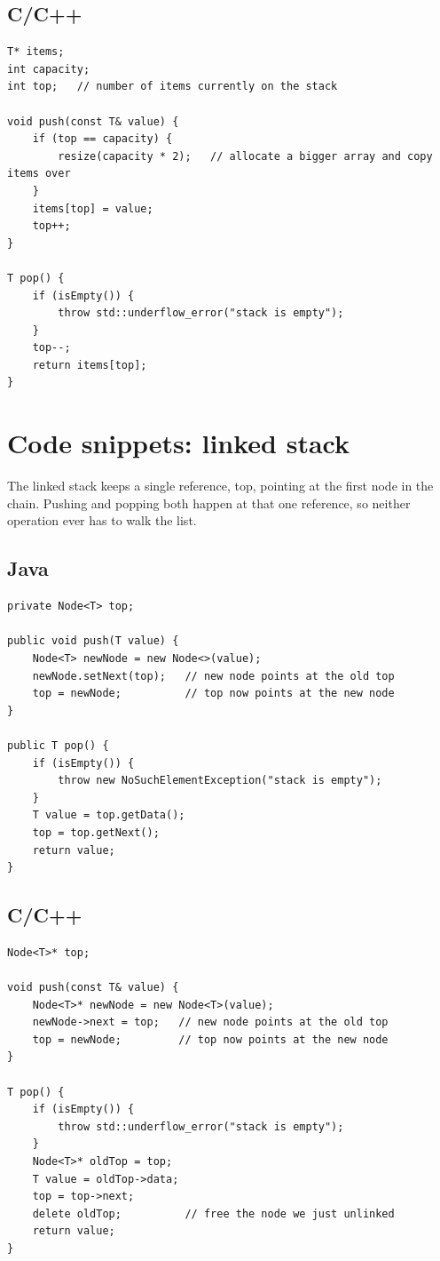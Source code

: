 \documentclass[11pt]{article}
\begin{document}
\subsection*{C/C++}

\begin{lstlisting}[style=cpp]
T* items;
int capacity;
int top;   // number of items currently on the stack

void push(const T& value) {
    if (top == capacity) {
        resize(capacity * 2);   // allocate a bigger array and copy items over
    }
    items[top] = value;
    top++;
}

T pop() {
    if (isEmpty()) {
        throw std::underflow_error("stack is empty");
    }
    top--;
    return items[top];
}
\end{lstlisting}

\section{Code snippets: linked stack}

The linked stack keeps a single reference, top, pointing at the first node in the chain.
Pushing and popping both happen at that one reference, so neither operation ever has to
walk the list.

\subsection*{Java}

\begin{lstlisting}[style=java]
private Node<T> top;

public void push(T value) {
    Node<T> newNode = new Node<>(value);
    newNode.setNext(top);   // new node points at the old top
    top = newNode;          // top now points at the new node
}

public T pop() {
    if (isEmpty()) {
        throw new NoSuchElementException("stack is empty");
    }
    T value = top.getData();
    top = top.getNext();
    return value;
}
\end{lstlisting}

\subsection*{C/C++}

\begin{lstlisting}[style=cpp]
Node<T>* top;

void push(const T& value) {
    Node<T>* newNode = new Node<T>(value);
    newNode->next = top;   // new node points at the old top
    top = newNode;         // top now points at the new node
}

T pop() {
    if (isEmpty()) {
        throw std::underflow_error("stack is empty");
    }
    Node<T>* oldTop = top;
    T value = oldTop->data;
    top = top->next;
    delete oldTop;          // free the node we just unlinked
    return value;
}
\end{lstlisting}
\end{document}
